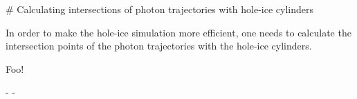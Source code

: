 
# Calculating intersections of photon trajectories with hole-ice cylinders

In order to make the hole-ice simulation more efficient, one needs to calculate the intersection points of the photon trajectories with the hole-ice cylinders.


Foo!

- 
- 

\lipsum
